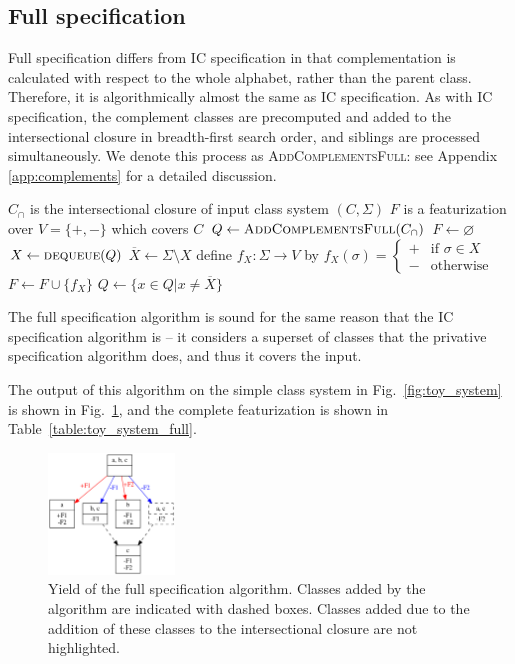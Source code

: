 \documentclass[12pt, oneside]{article}   	%
\begin{document}
\FloatBarrier
\subsection{Full specification}
\label{sec:full}

Full specification differs from IC specification in that complementation is calculated with respect to the whole alphabet, rather than the parent class. Therefore, it is algorithmically almost the same as IC specification. As with IC specification, the complement classes are precomputed and added to the intersectional closure in breadth-first search order, and siblings are processed simultaneously. We denote this process as \textsc{AddComplementsFull}: see Appendix \ref{app:complements} for a detailed discussion.
\noindent \begin{algorithmic}
	\singlespacing
    \REQUIRE $C_\cap$ is the intersectional closure of input class system $(C, \Sigma)$
    \ENSURE $F$ is a featurization over $V = \{ +, - \}$ which covers $C$
    \STATE
    \STATE $Q \leftarrow \textsc{AddComplementsFull}(C_\cap)$
    \STATE $F \leftarrow \varnothing$
    \STATE
        \STATE $X \leftarrow \textsc{dequeue}(Q)$
	        \STATE $\overline{X} \leftarrow \Sigma \setminus X$
            \STATE define $f_X : \Sigma \rightarrow V$ by $f_X (\sigma) = \begin{cases}
                    + & \text{if } \sigma \in X \\
                    - & \text{otherwise}
                    \end{cases}$
            \STATE $F \leftarrow F \cup \{f_X\}$
            \STATE $Q \leftarrow \{x \in Q \vert x \neq \overline{X} \}$
        \ENDIF
    \ENDWHILE
\end{algorithmic}
\doublespacing

\noindent The full specification algorithm is sound for the same reason that the IC specification algorithm is -- it considers a superset of classes that the privative specification algorithm does, and thus it covers the input.

The output of this algorithm on the simple class system in Fig.~\ref{fig:toy_system} is shown in Fig.~\ref{fig:toy_system_full_features}, and the complete featurization is shown in Table~\ref{table:toy_system_full}. 

\begin{figure}[htb!]
	\centering
	\includegraphics[width=0.3\textwidth]{toy_system_full_features_FEATURAL.png}
	\caption{Yield of the full specification algorithm. Classes added by the algorithm are indicated with dashed boxes. Classes added due to the addition of these classes to the intersectional closure are not highlighted.}
	\label{fig:toy_system_full_features}
\end{figure}
\end{document}
